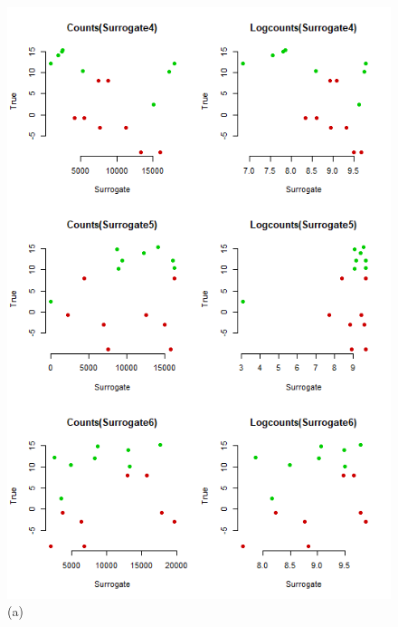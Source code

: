 \documentclass[a4paper,12pt]{article}
\begin{document}
	\begin{figure}[H]
		\begin{minipage}{0.5\textwidth}
			\includegraphics[scale=0.5]{exploration-2.png}\\(a)
		\end{minipage}
		\begin{minipage}{0.5\textwidth}

\end{minipage}
\end{figure}
\end{document}
